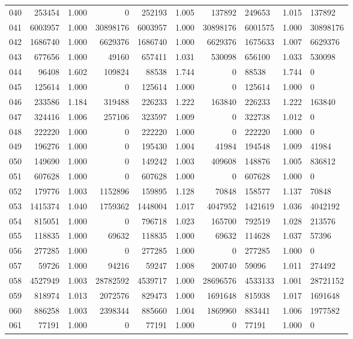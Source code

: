 \begin{longtable}{crrrrrr}
040 & 253454 & 1.000 & 0 & 252193 & 1.005 & 137892 & 249653 & 1.015 & 137892 \\
041 & 6003957 & 1.000 & 30898176 & 6003957 & 1.000 & 30898176 & 6001575 & 1.000 & 30898176 \\
042 & 1686740 & 1.000 & 6629376 & 1686740 & 1.000 & 6629376 & 1675633 & 1.007 & 6629376 \\
043 & 677656 & 1.000 & 49160 & 657411 & 1.031 & 530098 & 656100 & 1.033 & 530098 \\
044 & 96408 & 1.602 & 109824 & 88538 & 1.744 & 0 & 88538 & 1.744 & 0 \\
045 & 125614 & 1.000 & 0 & 125614 & 1.000 & 0 & 125614 & 1.000 & 0 \\
046 & 233586 & 1.184 & 319488 & 226233 & 1.222 & 163840 & 226233 & 1.222 & 163840 \\
047 & 324416 & 1.006 & 257106 & 323597 & 1.009 & 0 & 322738 & 1.012 & 0 \\
048 & 222220 & 1.000 & 0 & 222220 & 1.000 & 0 & 222220 & 1.000 & 0 \\
049 & 196276 & 1.000 & 0 & 195430 & 1.004 & 41984 & 194548 & 1.009 & 41984 \\
050 & 149690 & 1.000 & 0 & 149242 & 1.003 & 409608 & 148876 & 1.005 & 836812 \\
051 & 607628 & 1.000 & 0 & 607628 & 1.000 & 0 & 607628 & 1.000 & 0 \\
052 & 179776 & 1.003 & 1152896 & 159895 & 1.128 & 70848 & 158577 & 1.137 & 70848 \\
053 & 1415374 & 1.040 & 1759362 & 1448004 & 1.017 & 4047952 & 1421619 & 1.036 & 4042192 \\
054 & 815051 & 1.000 & 0 & 796718 & 1.023 & 165700 & 792519 & 1.028 & 213576 \\
055 & 118835 & 1.000 & 69632 & 118835 & 1.000 & 69632 & 114628 & 1.037 & 57396 \\
056 & 277285 & 1.000 & 0 & 277285 & 1.000 & 0 & 277285 & 1.000 & 0 \\
057 & 59726 & 1.000 & 94216 & 59247 & 1.008 & 200740 & 59096 & 1.011 & 274492 \\
058 & 4527949 & 1.003 & 28782592 & 4539717 & 1.000 & 28696576 & 4533133 & 1.001 & 28721152 \\
059 & 818974 & 1.013 & 2072576 & 829473 & 1.000 & 1691648 & 815938 & 1.017 & 1691648 \\
060 & 886258 & 1.003 & 2398344 & 885660 & 1.004 & 1869960 & 883441 & 1.006 & 1977582 \\
061 & 77191 & 1.000 & 0 & 77191 & 1.000 & 0 & 77191 & 1.000 & 0 \\

\end{longtable}
